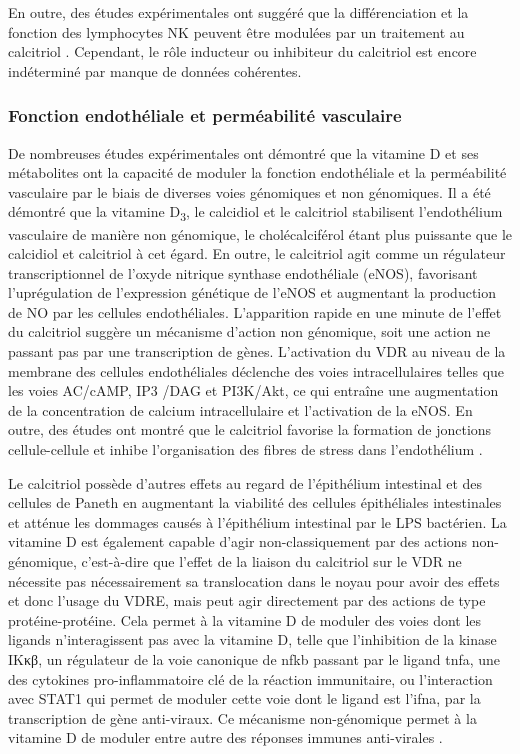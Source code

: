 \documentclass[
  a4paper,
  DIV=11,
  numbers=noendperiod,
  listof=totoc]{scrreprt}
\begin{document}
En outre, des études expérimentales ont suggéré que la différenciation
et la fonction des lymphocytes \ac{NK} peuvent être modulées par un
traitement au calcitriol \autocite{Charoenngam.2020}. Cependant, le rôle
inducteur ou inhibiteur du calcitriol est encore indéterminé par manque
de données cohérentes.

\hypertarget{fonction-endothuxe9liale-et-permuxe9abilituxe9-vasculaire}{%
\subsubsection{Fonction endothéliale et perméabilité
vasculaire}\label{fonction-endothuxe9liale-et-permuxe9abilituxe9-vasculaire}}

De nombreuses études expérimentales ont démontré que la vitamine D et
ses métabolites ont la capacité de moduler la fonction endothéliale et
la perméabilité vasculaire par le biais de diverses voies génomiques et
non génomiques. Il a été démontré que la vitamine D\textsubscript{3}, le
calcidiol et le calcitriol stabilisent l'endothélium vasculaire de
manière non génomique, le cholécalciférol étant plus puissante que le
calcidiol et calcitriol à cet égard. En outre, le calcitriol agit comme
un régulateur transcriptionnel de l'oxyde nitrique synthase endothéliale
(\acs{eNOS}), favorisant l'uprégulation de l'expression
génétique de l'\ac{eNOS} et augmentant la production de \ac{NO} par les
cellules endothéliales. L'apparition rapide en une minute de l'effet du
calcitriol suggère un mécanisme d'action non génomique, soit une action
ne passant pas par une transcription de gènes. L'activation du \ac{VDR}
au niveau de la membrane des cellules endothéliales déclenche des voies
intracellulaires telles que les voies AC/cAMP, IP3 /DAG et PI3K/Akt, ce
qui entraîne une augmentation de la concentration de calcium
intracellulaire et l'activation de la \ac{eNOS}. En outre, des études
ont montré que le calcitriol favorise la formation de jonctions
cellule-cellule et inhibe l'organisation des fibres de stress dans
l'endothélium \autocite{Charoenngam.2020}.

Le calcitriol possède d'autres effets au regard de l'épithélium
intestinal et des cellules de Paneth en augmentant la viabilité des
cellules épithéliales intestinales et atténue les dommages causés à
l'épithélium intestinal par le \ac{LPS} bactérien. La vitamine D est
également capable d'agir non-classiquement par des actions
non-génomique, c'est-à-dire que l'effet de la liaison du calcitriol sur
le VDR ne nécessite pas nécessairement sa translocation dans le noyau
pour avoir des effets et donc l'usage du \ac{VDRE}, mais peut agir
directement par des actions de type protéine-protéine. Cela permet à la
vitamine D de moduler des voies dont les ligands n'interagissent pas
avec la vitamine D, telle que l'inhibition de la kinase \ac{IKκβ}, un
régulateur de la voie canonique de \ac{nfkb} passant par le ligand
\ac{tnfa}, une des cytokines pro-inflammatoire clé de la réaction
immunitaire, ou l'interaction avec STAT1 qui permet de moduler cette
voie dont le ligand est l'\ac{ifna}, par la transcription de gène
anti-viraux. Ce mécanisme non-génomique permet à la vitamine D de
moduler entre autre des réponses immunes anti-virales
\autocite{Hii.2016}.
\end{document}
